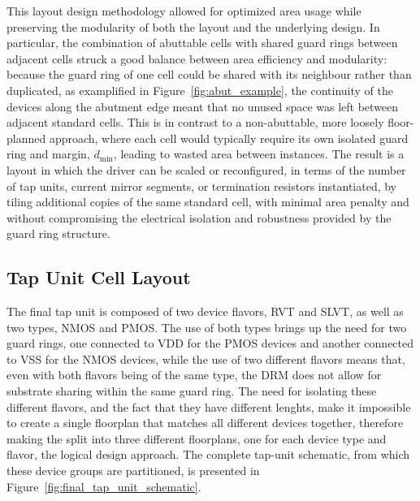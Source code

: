 This layout design methodology allowed for optimized area usage while preserving the modularity of both the layout and the underlying design. In particular, the combination of abuttable cells with shared guard rings between adjacent cells struck a good balance between area efficiency and modularity: because the guard ring of one cell could be shared with its neighbour rather than duplicated, as examplified in Figure~\ref{fig:abut_example}, the continuity of the devices along the abutment edge meant that no unused space was left between adjacent standard cells. This is in contrast to a non-abuttable, more loosely floor-planned approach, where each cell would typically require its own isolated guard ring and margin, $d_{\min}$, leading to wasted area between instances. The result is a layout in which the driver can be scaled or reconfigured, in terms of the number of tap units, current mirror segments, or termination resistors instantiated, by tiling additional copies of the same standard cell, with minimal area penalty and without compromising the electrical isolation and robustness provided by the guard ring structure.

\subsection{Tap Unit Cell Layout}\label{sec:tap_unit_layout}

The final tap unit is composed of two device flavors, \ac{RVT} and \ac{SLVT}, as well as two types, NMOS and PMOS. The use of both types brings up the need for two guard rings, one connected to VDD for the PMOS devices and another connected to VSS for the NMOS devices, while the use of two different flavors means that, even with both flavors being of the same type, the \ac{DRM} does not allow for substrate sharing within the same guard ring. The need for isolating these different flavors, and the fact that they have different lenghts, make it impossible to create a single floorplan that matches all different devices together, therefore making the split into three different floorplans, one for each device type and flavor, the logical design approach. The complete tap-unit schematic, from which these device groups are partitioned, is presented in Figure~\ref{fig:final_tap_unit_schematic}. 


